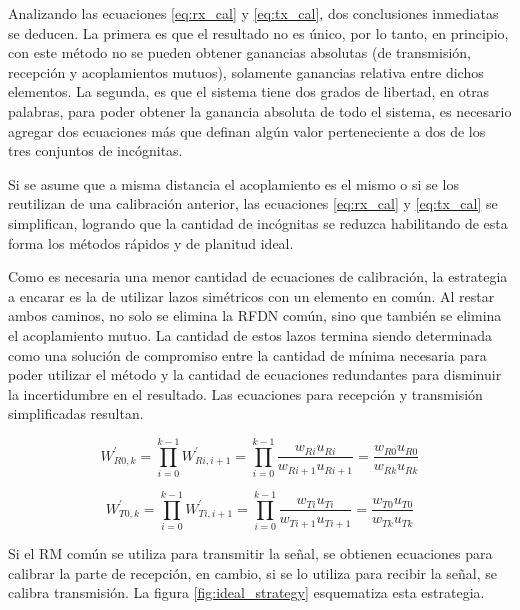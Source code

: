 Analizando las ecuaciones \ref{eq:rx_cal} y \ref{eq:tx_cal}, dos conclusiones inmediatas se deducen. La primera es que el
resultado no es único, por lo tanto, en principio, con este método no se pueden obtener ganancias absolutas (de transmisión,
recepción y acoplamientos mutuos), solamente ganancias relativa entre dichos elementos. La segunda, es que el sistema tiene
dos grados de libertad, en otras palabras, para poder obtener la ganancia absoluta de todo el sistema, es necesario agregar
dos ecuaciones más que definan algún valor perteneciente a dos de los tres conjuntos de incógnitas.

Si se asume que a misma distancia el acoplamiento es el mismo o si se los reutilizan de una calibración anterior, las
ecuaciones \ref{eq:rx_cal} y \ref{eq:tx_cal} se simplifican, logrando que la cantidad de incógnitas se reduzca habilitando
de esta forma los métodos rápidos y de planitud ideal. 

Como es necesaria una menor cantidad de ecuaciones de calibración, la estrategia a encarar es la de utilizar lazos simétricos
con un elemento en común. Al restar ambos caminos, no solo se elimina la RFDN común, sino que también se elimina el
acoplamiento mutuo. La cantidad de estos lazos termina siendo determinada como una solución de compromiso entre la cantidad de
mínima necesaria para poder utilizar el método y la cantidad de ecuaciones redundantes para disminuir la incertidumbre en el
resultado. Las ecuaciones para recepción y transmisión simplificadas resultan.

\begin{equation}
	W^{'}_{R0,k} = \prod_{i=0}^{k-1} W^{'}_{Ri,i+1} = \prod_{i=0}^{k-1}\dfrac{w_{Ri} u_{Ri}}{w_{Ri + 1} u_{Ri + 1}} =
	\dfrac{w_{R0} u_{R0}}{w_{Rk} u_{Rk}}
	\label{eq:rx_simp_cal}
\end{equation}

\begin{equation}
	W^{'}_{T0,k} = \prod_{i=0}^{k-1} W^{'}_{Ti,i+1} = \prod_{i=0}^{k-1}\dfrac{w_{Ti} u_{Ti}}{w_{Ti + 1} u_{Ti + 1}} =
	\dfrac{w_{T0} u_{T0}}{w_{Tk} u_{Tk}}
	\label{eq:tx_simp_cal}
\end{equation}

Si el RM común se utiliza para transmitir la señal, se obtienen ecuaciones para calibrar la parte de recepción, en cambio,
si se lo utiliza para recibir la señal, se calibra transmisión. La figura \ref{fig:ideal_strategy} esquematiza esta estrategia.

